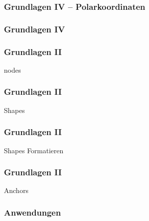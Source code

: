 \documentclass[14pt,ngerman]{beamer}
\begin{document}
\begin{frame}
\frametitle{Grundlagen IV -- Polarkoordinaten}

\begin{center}
\end{center}

\end{frame}

\begin{frame}
\frametitle{Grundlagen IV}



\end{frame}

\begin{frame}
\frametitle{Grundlagen II}

nodes

\end{frame}


\begin{frame}
\frametitle{Grundlagen II}

Shapes

\end{frame}



\begin{frame}
\frametitle{Grundlagen II}

Shapes Formatieren

\end{frame}



\begin{frame}
\frametitle{Grundlagen II}

Anchors
\end{frame}

\begin{frame}
\frametitle{Anwendungen}


\end{frame}
\end{document}
